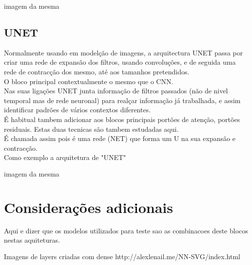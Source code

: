imagem da mesma

\subsection{UNET\label{se:UNET}}

Normalmente usando em modelção de imagens, a arquitectura UNET passa por criar uma rede de expansão dos filtros, usando convoluções, e de seguida uma rede de contracção dos mesmo, até aos tamanhos pretendidos.\\
O bloco principal contextualmente o mesmo que o CNN.\\
Nas suas ligações UNET junta informação de filtros passados (não de nivel temporal mas de rede neuronal) para realçar informação já trabalhada, e assim identificar padrões de vários contextos diferentes.\\
É habitual tambem adicionar aos blocos principais portões de atenção, portões residuais. Estas duas tecnicas são tambem estudadas aqui.\\
É chamada assim pois é uma rede (NET) que forma um U na sua expansão e contracção.\\

Como exemplo a arquitetura de "UNET"

imagem da mesma


\section{Considerações adicionais\label{se:modelos_plus}}

Aqui e dizer que os modelos utilizados para teste sao as combinacoes deste blocos nestas aquiteturas.

Imagens de layers criadas com 
dense
http://alexlenail.me/NN-SVG/index.html